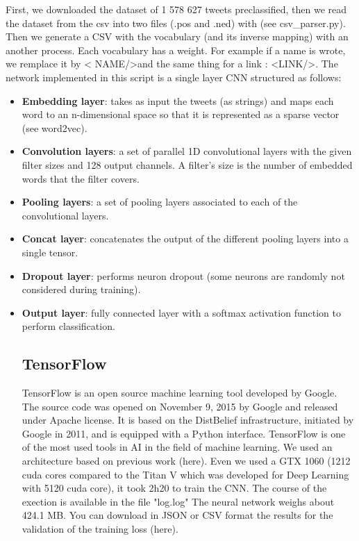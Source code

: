 \documentclass{acmtog} %
\begin{document}
First, we downloaded the dataset of 1 578 627 tweets preclassified, then we read the dataset from the csv into two files (.pos and .ned) with (see csv\_parser.py). Then we generate a CSV with the vocabulary (and its inverse mapping) with an another process. Each vocabulary has a weight.
For example if a name is wrote, we remplace it by \textless 
NAME/\textgreater and the same thing for a link : \textless LINK/\textgreater.
The network implemented in this script is a single layer CNN structured as follows:
\begin{itemize}
\item  \textbf{Embedding layer}: takes as input the tweets (as strings) and maps each word to an n-dimensional space so that it is represented as a sparse vector (see word2vec).
\item  \textbf{Convolution layers}: a set of parallel 1D convolutional layers with the given filter sizes and 128 output channels. A filter's size is the number of embedded words that the filter covers.
\item  \textbf{Pooling layers}: a set of pooling layers associated to each of the convolutional layers.
\item  \textbf{Concat layer}: concatenates the output of the different pooling layers into a single tensor.
\item  \textbf{Dropout layer}: performs neuron dropout (some neurons are randomly not considered during training).
\item  \textbf{Output layer}: fully connected layer with a softmax activation function to perform classification.

\subsection{TensorFlow}
\label{subsub:dl}

TensorFlow is an open source machine learning tool developed by Google. The source code was opened on November 9, 2015 by Google and released under Apache license.
It is based on the DistBelief infrastructure, initiated by Google in 2011, and is equipped with a Python interface.
TensorFlow is one of the most used tools in AI in the field of machine learning.
We used an architecture based on previous work (here).
Even we used a GTX 1060 (1212 cuda cores compared to the Titan V which was developed for Deep Learning with 5120 cuda core), it took 2h20 to train the CNN.
The course of the exection is available in the file "log.log"
The neural network weighs about 424.1 MB.
You can download in JSON or CSV format the results for the validation of the training loss (here).


\end{itemize}
\end{document}
